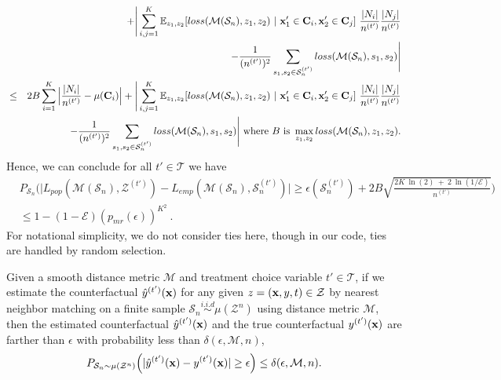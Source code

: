 {\begin{eqnarray*}
       && + \Bigg| \sum_{i,j=1}^{K} \mathbb{E}_{z_1,z_2}[loss(\mathcal{M}(\mathcal{S}_n),z_1,z_2)~|~\mathbf{x}'_1\in\mathbf{C}_i,\mathbf{x}'_2\in\mathbf{C}_j]~
        \frac{|N_i|}{n^{(t')}} \frac{|N_j|}{n^{(t')}} \\&& - \frac{1}{(n^{(t')})^2}\sum_{s_1,s_2\in\mathcal{S}^{(t')}_n} loss(\mathcal{M}(\mathcal{S}_n),s_1,s_2) \Bigg|\\
    &\leq& 2B\sum_{i=1}^{K}\Big| \frac{|N_i|}{n^{(t')}} - \mu(\mathbf{C}_i) \Big| + \Bigg| \sum_{i,j=1}^{K} \mathbb{E}_{z_1,z_2}[loss(\mathcal{M}(\mathcal{S}_n),z_1,z_2)~|~\mathbf{x}'_1\in\mathbf{C}_i,\mathbf{x}'_2\in\mathbf{C}_j]~
        \frac{|N_i|}{n^{(t')}} \frac{|N_j|}{n^{(t')}} \\&& - \frac{1}{(n^{(t')})^2}\sum_{s_1,s_2\in\mathcal{S}^{(t')}_n} loss(\mathcal{M}(\mathcal{S}_n),s_1,s_2) \Bigg| \text{ where $B$ is }\max_{z_1,z_2} loss(\mathcal{M}(\mathcal{S}_n),z_1,z_2).
\end{eqnarray*}
}
Hence, we can conclude for all $t'\in\mathcal{T}$ we have
\begin{eqnarray*}
   & P_{\mathcal{S}_n}\Bigg( \Big| L_{pop}(\mathcal{M}(\mathcal{S}_n),\mathcal{Z}^{(t')}) - L_{emp}(\mathcal{M}(\mathcal{S}_n),\mathcal{S}_n^{(t')}) \Big| \geq \epsilon(\mathcal{S}^{(t')}_n) + 2B\sqrt{\frac{2K~\ln(2)~+~2~\ln(1/\mathcal{E})}{n^{(t')}}} \Bigg) \\
    &\leq 1 - (1-\mathcal{E})(p_{mr}(\epsilon))^{K^2}~.
\end{eqnarray*}
For notational simplicity, we do not consider ties here, though in our code, ties are handled by random selection.


\begin{lemma}
\label{lm: smoothy}
Given a smooth distance metric $\mathcal{M}$ and treatment choice variable $t'\in\mathcal{T}$, if we estimate the counterfactual $\hat{y}^{(t')}(\mathbf{x})$ for any given $z = (\mathbf{x},y,t) \in \mathcal{Z}$  by nearest neighbor matching on a finite sample $\mathcal{S}_n \overset{i.i.d}{\sim}\mu(\mathcal{Z}^n)$ using distance metric $\mathcal{M}$, then the estimated counterfactual $\hat{y}^{(t')}(\mathbf{x})$ and the true counterfactual $y^{(t')}(\mathbf{x})$ are farther than $\epsilon$ with probability less than $\delta(\epsilon,\mathcal{M},n)$,
$$ P_{\mathcal{S}_n \sim \mu(\mathcal{Z}^n)}\Big( |\hat{y}^{(t')}(\mathbf{x}) - y^{(t')}(\mathbf{x})| \geq \epsilon \Big) \leq \delta(\epsilon,\mathcal{M},n). $$
\end{lemma}


